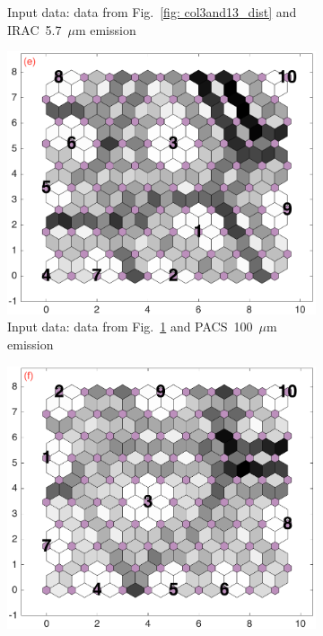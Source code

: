 \begin{figure}
\begin{subfigure}[b]{0.25\textwidth}
        \caption{Input data: data from Fig.~\ref{fig: col3and13_dist} and IRAC~5.7~$\mu$m emission}
        \label{fig: col3and14_dist}
    \end{subfigure}
        \hfill
    \begin{subfigure}[b]{0.25\textwidth}
        \centering
        \includegraphics[width=\textwidth]{../../images0.01/M31/2D/diff_dimension/combine_2D_data_between_cols3and15.png}
        \caption{Input data: data from Fig.~\ref{fig: col3and14_dist} and PACS~100~$\mu$m emission }
        \label{fig: col3and15_dist}
    \end{subfigure}
        \hfill
    \begin{subfigure}[b]{0.25\textwidth}
        \centering
        \includegraphics[width=\textwidth]{../../images0.01/M31/2D/diff_dimension/combine_2D_data_between_cols3and16.png}

\end{subfigure}
\end{figure}
